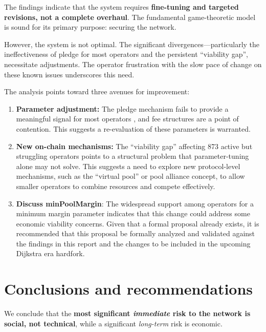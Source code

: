 \documentclass[11pt, letterpaper]{article}
\begin{document}
The findings indicate that the system requires \textbf{fine-tuning and targeted revisions,
not a complete overhaul}. The fundamental game-theoretic model is sound for its primary purpose:
securing the network.

However, the system is not optimal. The significant divergences—particularly the ineffectiveness
of pledge for most operators and the persistent ``viability gap'', necessitate adjustments. The operator
frustration with the slow pace of change on these known issues underscores this need.

The analysis points toward three avenues for improvement:
\begin{enumerate}
	\item \textbf{Parameter adjustment:} The pledge mechanism fails to provide a meaningful signal
	      for most operators , and fee structures are a point of contention. This suggests a re-evaluation
	      of these parameters is warranted.
	\item \textbf{New on-chain mechanisms:} The ``viability gap'' affecting 873 active but struggling
	      operators points to a structural problem that parameter-tuning alone may not solve. This suggests
	      a need to explore new protocol-level mechanisms, such as the ``virtual pool'' or pool alliance concept,
	      to allow smaller operators to combine resources and compete effectively.
	\item \textbf{Discuss minPoolMargin}: The widespread support among operators for a minimum margin
	      parameter indicates that this change could address some economic viability concerns. Given that
	      a formal proposal already exists, it is recommended that this proposal be formally analyzed and
	      validated against the findings in this report and the changes to be included in the upcoming Dijkstra
		  era hardfork.

\end{enumerate}

\section{Conclusions and recommendations}

We conclude that the \textbf{most significant \textit{immediate} risk to the network is social,
	not technical}, while a significant \textit{long-term} risk is economic.
\end{document}
